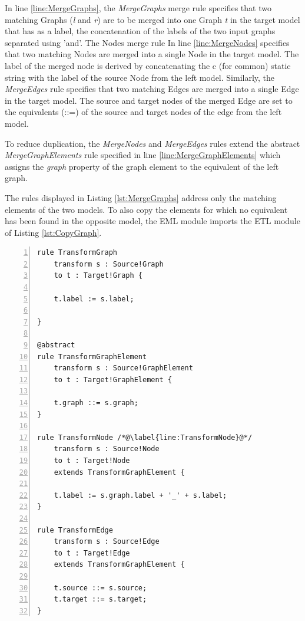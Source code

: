 In line \ref{line:MergeGraphs}, the \emph{MergeGraphs} merge rule specifies that two matching Graphs (\emph{l} and \emph{r}) are to be merged into one Graph \emph{t} in the target model that has as a label, the concatenation of the labels of the two input graphs separated using 'and'. The Nodes merge rule In line \ref{line:MergeNodes} specifies that two matching Nodes are merged into a single Node in the target model. The label of the merged node is derived by concatenating the c (for common) static string with the label of the source Node from the left model. Similarly, the \emph{MergeEdges} rule specifies that two matching Edges are merged into a single Edge in the target model. The source and target nodes of the merged Edge are set to the equivalents (::=) of the source and target nodes of the edge from the left model.

To reduce duplication, the \emph{MergeNodes} and \emph{MergeEdges} rules extend the abstract \emph{MergeGraphElements} rule specified in line \ref{line:MergeGraphElements} which assigns the \emph{graph} property of the graph element to the equivalent of the left graph.

The rules displayed in Listing \ref{lst:MergeGraphs} address only the matching elements of the two models. To also copy the elements for which no equivalent has been found in the opposite model, the EML module imports the ETL module of Listing \ref{lst:CopyGraph}.

\begin{lstlisting}[basicstyle=\ttfamily\footnotesize, flexiblecolumns=true, numbers=left, nolol=true, caption=The Graphs.etl ETL transformation module, label=lst:CopyGraph, language=ETL, tabsize=2]
rule TransformGraph 
	transform s : Source!Graph
	to t : Target!Graph {
	
	t.label := s.label;
	
}

@abstract
rule TransformGraphElement 
	transform s : Source!GraphElement
	to t : Target!GraphElement {
	
	t.graph ::= s.graph;
}

rule TransformNode /*@\label{line:TransformNode}@*/
	transform s : Source!Node
	to t : Target!Node 
	extends TransformGraphElement {
	
	t.label := s.graph.label + '_' + s.label;
}

rule TransformEdge 
	transform s : Source!Edge
	to t : Target!Edge 
	extends TransformGraphElement {
	
	t.source ::= s.source;
	t.target ::= s.target;	
} 
\end{lstlisting}

